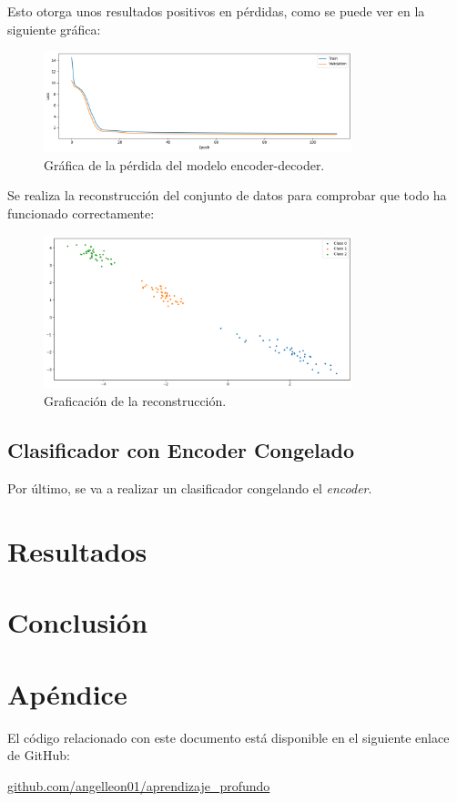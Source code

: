 \documentclass[paper=a4, fontsize=11pt]{scrartcl} %
\numberwithin{equation}{section} %
\numberwithin{figure}{section} %
\numberwithin{table}{section} %
\begin{document}
Esto otorga unos resultados positivos en pérdidas, como se puede ver en la siguiente gráfica:

\begin{figure}[H]
\centering
\includegraphics[width=0.8\textwidth]{images/loss_encoder.png}
\caption{Gráfica de la pérdida del modelo encoder-decoder.}
\end{figure}

Se realiza la reconstrucción del conjunto de datos para comprobar que todo ha funcionado correctamente:

\begin{figure}[H]
\centering
\includegraphics[width=0.8\textwidth]{images/reconstruction.png}
\caption{Graficación de la reconstrucción.}
\end{figure}


\subsection{Clasificador con Encoder Congelado}

Por último, se va a realizar un clasificador congelando el \textit{encoder}. 


\section{Resultados}


\section{Conclusión}

\newpage
\appendix
\section*{Apéndice}
El código relacionado con este documento está disponible en el siguiente enlace de GitHub:
\begin{center}
    \href{https://github.com/angelleon01/aprendizaje_profundo}{github.com/angelleon01/aprendizaje\_profundo}
\end{center}
\end{document}
